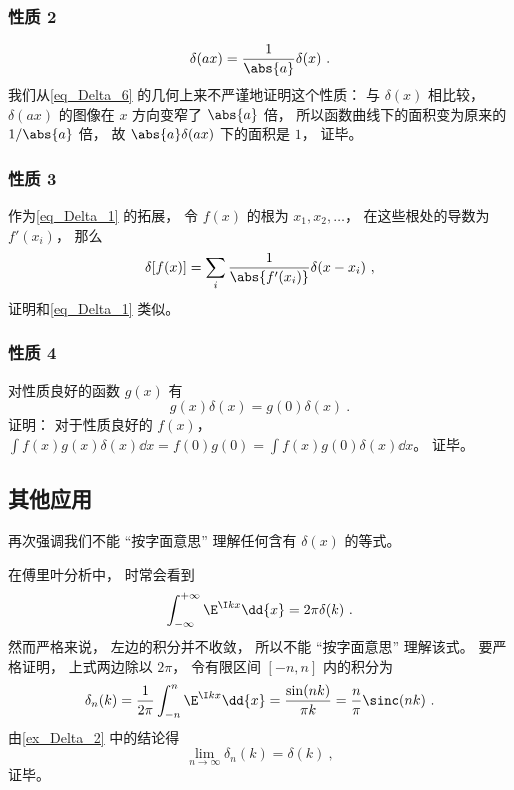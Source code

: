 \subsubsection{性质 2}
\begin{equation}\label{eq_Delta_1}
\delta(ax) = \frac{1}{\abs{a}} \delta(x)~.
\end{equation}
我们从\autoref{eq_Delta_6} 的几何上来不严谨地证明这个性质： 与 $\delta(x)$ 相比较， $\delta(ax)$ 的图像在 $x$ 方向变窄了 $\abs{a}$ 倍， 所以函数曲线下的面积变为原来的 $1/\abs{a}$ 倍， 故 $\abs{a}\delta(ax)$ 下的面积是 $1$， 证毕。

\subsubsection{性质 3}
作为\autoref{eq_Delta_1} 的拓展， 令 $f(x)$ 的根为 $x_1, x_2, \dots$， 在这些根处的导数为 $f'(x_i)$， 那么
\begin{equation}\label{eq_Delta_12}
\delta[f(x)] = \sum_i \frac{1}{\abs{f'(x_i)}} \delta(x - x_i)~,
\end{equation}
证明和\autoref{eq_Delta_1} 类似。

\subsubsection{性质 4}
对性质良好的函数 $g(x)$ 有
\begin{equation}
g(x)\delta(x) = g(0)\delta(x)~.
\end{equation}
证明： 对于性质良好的 $f(x)$， $\int f(x) g(x)\delta(x) \dd{x} = f(0)g(0) = \int f(x)g(0)\delta(x) \dd{x}$。 证毕。

\subsection{其他应用}
再次强调我们不能 “按字面意思” 理解任何含有 $\delta(x)$ 的等式。
\begin{example}{}\label{ex_Delta_1}
在傅里叶分析中， 时常会看到
\begin{equation}\label{eq_Delta_8}
\int_{-\infty}^{+\infty} \E^{\I kx}\dd{x} = 2\pi \delta(k)~.
\end{equation}
然而严格来说， 左边的积分并不收敛， 所以不能 “按字面意思” 理解该式。 要严格证明， 上式两边除以 $2\pi$， 令有限区间 $[-n,n]$ 内的积分为
\begin{equation}
\delta_n(k) = \frac{1}{2\pi}\int_{-n}^{n} \E^{\I kx}\dd{x} = \frac{\sin(n k)}{\pi k} = \frac{n}{\pi} \sinc(n k)~.
\end{equation}
由\autoref{ex_Delta_2} 中的结论得
\begin{equation}
\lim_{n\to\infty} \delta_n(k) = \delta(k)~,
\end{equation}
证毕。
\end{example}

